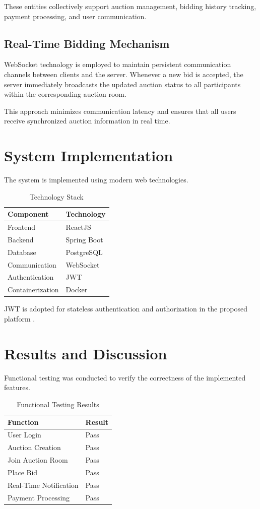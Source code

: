 \documentclass[runningheads]{llncs}
\begin{document}
These entities collectively support auction management, bidding history tracking, payment processing, and user communication.

\subsection{Real-Time Bidding Mechanism}

WebSocket technology is employed to maintain persistent communication channels between clients and the server. Whenever a new bid is accepted, the server immediately broadcasts the updated auction status to all participants within the corresponding auction room.

This approach minimizes communication latency and ensures that all users receive synchronized auction information in real time.

\section{System Implementation}

The system is implemented using modern web technologies.

\begin{table}[ht]
\caption{Technology Stack}
\centering
\begin{tabular}{|l|l|}
\hline
Component & Technology \\ \hline
Frontend & ReactJS \\
Backend & Spring Boot \\
Database & PostgreSQL \\
Communication & WebSocket \\
Authentication & JWT \\
Containerization & Docker \\
\hline
\end{tabular}
\end{table}
JWT is adopted for stateless authentication and authorization in the proposed platform \cite{jwt}.
\section{Results and Discussion}

Functional testing was conducted to verify the correctness of the implemented features.

\begin{table}[ht]
\caption{Functional Testing Results}
\centering
\begin{tabular}{|l|l|}
\hline
Function & Result \\ \hline
User Login & Pass \\
Auction Creation & Pass \\
Join Auction Room & Pass \\
Place Bid & Pass \\
Real-Time Notification & Pass \\
Payment Processing & Pass \\
\hline
\end{tabular}
\end{table}
\end{document}
